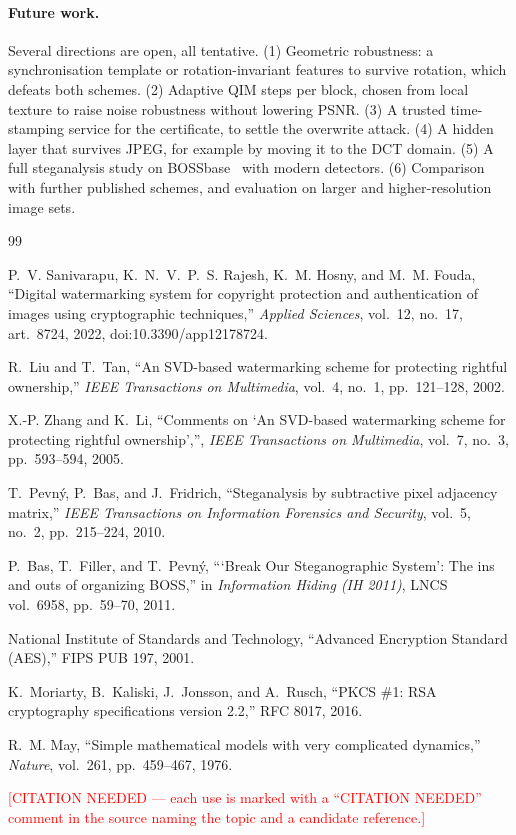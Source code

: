 \documentclass[11pt,a4paper]{article}
\newcommand{\todo}[1]{\textcolor{red}{[#1]}}
\begin{document}
\paragraph{Future work.} Several directions are open, all tentative. (1) Geometric robustness: a synchronisation template or rotation-invariant features to survive rotation, which defeats both schemes. (2) Adaptive QIM steps per block, chosen from local texture to raise noise robustness without lowering PSNR. (3) A trusted time-stamping service for the certificate, to settle the overwrite attack. (4) A hidden layer that survives JPEG, for example by moving it to the DCT domain. (5) A full steganalysis study on BOSSbase~\cite{bas2011boss} with modern detectors. (6) Comparison with further published schemes, and evaluation on larger and higher-resolution image sets.

\begin{thebibliography}{99}

P.~V. Sanivarapu, K.~N.~V.~P.~S. Rajesh, K.~M. Hosny, and M.~M. Fouda,
``Digital watermarking system for copyright protection and authentication of images using cryptographic techniques,''
\emph{Applied Sciences}, vol.~12, no.~17, art.~8724, 2022, doi:10.3390/app12178724.

R.~Liu and T.~Tan,
``An SVD-based watermarking scheme for protecting rightful ownership,''
\emph{IEEE Transactions on Multimedia}, vol.~4, no.~1, pp.~121--128, 2002.

X.-P. Zhang and K.~Li,
``Comments on `An SVD-based watermarking scheme for protecting rightful ownership','',
\emph{IEEE Transactions on Multimedia}, vol.~7, no.~3, pp.~593--594, 2005.

T.~Pevn\'y, P.~Bas, and J.~Fridrich,
``Steganalysis by subtractive pixel adjacency matrix,''
\emph{IEEE Transactions on Information Forensics and Security}, vol.~5, no.~2, pp.~215--224, 2010.

P.~Bas, T.~Filler, and T.~Pevn\'y,
```Break Our Steganographic System': The ins and outs of organizing BOSS,''
in \emph{Information Hiding (IH 2011)}, LNCS vol.~6958, pp.~59--70, 2011.

National Institute of Standards and Technology,
``Advanced Encryption Standard (AES),''
FIPS PUB 197, 2001.

K.~Moriarty, B.~Kaliski, J.~Jonsson, and A.~Rusch,
``PKCS \#1: RSA cryptography specifications version 2.2,''
RFC 8017, 2016.

R.~M. May,
``Simple mathematical models with very complicated dynamics,''
\emph{Nature}, vol.~261, pp.~459--467, 1976.

\todo{CITATION NEEDED --- each use is marked with a ``CITATION NEEDED'' comment in the source naming the topic and a candidate reference.}

\end{thebibliography}
\end{document}
